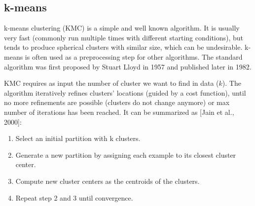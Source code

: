 \documentclass[conference]{IEEEtran}
\begin{document}
\subsection{k-means}
k-means clustering (KMC) is a simple and well known algorithm. It is usually very
fast (commonly run multiple times with different starting conditions), but tends
to produce spherical clusters with similar size, which can be undesirable.
k-means is often used as a preprocessing step for other algorithms. The standard
algorithm was first proposed by Stuart Lloyd in 1957 and published later in 1982.

KMC requires as input the number of cluster we want to find in data ($k$).
The algorithm iteratively refines clusters' locations (guided by a cost function),
until no more refinements are possible (clusters do not change anymore)
or max number of iterations has been reached. It can be summarized as [Jain et al., 2000]:

\begin{enumerate}
    \item Select an initial partition with k clusters.
    \item Generate a new partition by assigning each example to its closest cluster center.
    \item Compute new cluster centers as the centroids of the clusters.
    \item Repeat step 2 and 3 until convergence.
\end{enumerate}

\end{document}
